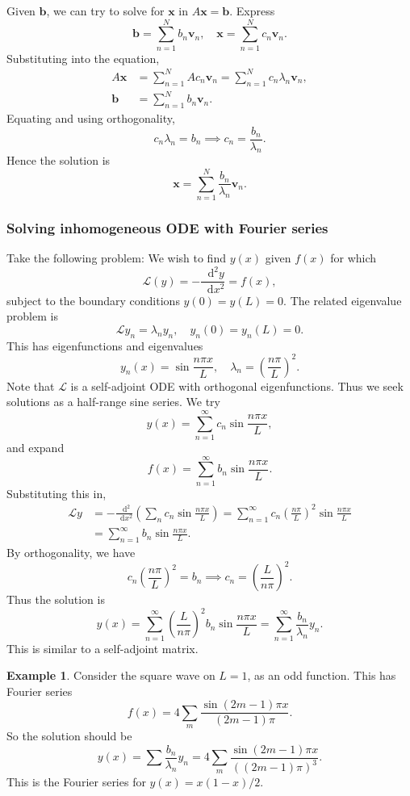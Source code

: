 \documentclass[12pt]{article}
\newcommand{\diff}{\mathop{}\!\mathrm{d}}
\newcommand{\Diff}[1]{\mathop{}\!\mathrm{d}^{#1}}
\theoremstyle{definition}
\newtheorem{example}{Example}[section]
\theoremstyle{remark}
\begin{document}
Given $\mathbf{b}$, we can try to solve for $\mathbf{x}$ in $A \mathbf{x} = \mathbf{b}$. Express 
\[
	\mathbf{b} = \sum_{n = 1}^{N} b_n \mathbf{v}_n, \quad \mathbf{x} = \sum_{n = 1}^{N} c_n \mathbf{v}_n
.\]
Substituting into the equation,
\begin{align*}
	A \mathbf{x} &= \sum_{n = 1}^{N} A c_n \mathbf{v}_n = \sum_{n = 1}^{N} c_n \lambda_n \mathbf{v}_n, \\
	\mathbf{b} &= \sum_{n = 1}^{N} b_n \mathbf{v}_n.
\end{align*}
Equating and using orthogonality,
\[
c_n \lambda_n = b_n \implies c_n = \frac{b_n}{\lambda_n}
.\]
Hence the solution is
\[
\mathbf{x} = \sum_{n = 1}^{N}\frac{b_n}{\lambda_n} \mathbf{v}_n
.\]

\subsubsection{Solving inhomogeneous ODE with Fourier series}%
\label{subsub:solving_inhomogeneous_ode_with_fourier_series}

Take the following problem: We wish to find $y(x)$ given $f(x)$ for which
\[
	\mathcal{L}(y) = - \frac{\Diff2 y}{\diff x^2} = f(x)
,\]
subject to the boundary conditions $y(0) = y(L) = 0$. The related eigenvalue problem is 
\[
	\mathcal{L}y_n = \lambda_n y_n, \quad y_n(0) = y_n(L) = 0
.\]
This has eigenfunctions and eigenvalues
\[
	y_n(x) = \sin \frac{n \pi x}{L}, \quad \lambda_n = \left( \frac{n \pi}{L} \right)^2
.\]
Note that $\mathcal{L}$ is a self-adjoint ODE with orthogonal eigenfunctions. Thus we seek solutions as a half-range sine series. We try
\[
	y(x) = \sum_{n = 1}^{\infty} c_n \sin \frac{n \pi x}{L},
\]
and expand
\[
	f(x) = \sum_{n = 1}^{\infty} b_n \sin \frac{n \pi x}{L}
.\]
Substituting this in,
\begin{align*}
	\mathcal{L}y &= - \frac{\Diff2}{\diff x^2} \left( \sum_{n} c_n \sin \frac{n \pi x}{L} \right) = \sum_{n = 1}^{\infty} c_n \left(\frac{n \pi}{L} \right)^2 \sin \frac{n \pi x}{L} \\
		     &= \sum_{n = 1}^{\infty} b_n \sin \frac{n \pi x}{L}.
\end{align*}
By orthogonality, we have
\[
	c_n \left( \frac{n \pi}{L}\right)^2 = b_n \implies c_n = \left( \frac{L}{n \pi} \right)^2
.\]
Thus the solution is
\[
	y(x) = \sum_{n = 1}^{\infty} \left( \frac{L}{n \pi}\right)^2 b_n \sin \frac{n \pi x}{L} = \sum_{n = 1}^{\infty} \frac{b_n}{\lambda_n} y_n
.\]
This is similar to a self-adjoint matrix.

\begin{adjustbox}{minipage = \columnwidth - 25.5pt, margin=1em, frame=1pt, margin=0em}
\begin{example}
	Consider the square wave on $L = 1$, as an odd function. This has Fourier series
	\[
		f(x) = 4 \sum_{m} \frac{\sin (2m - 1)\pi x}{(2m - 1)\pi}
	.\]
	So the solution should be
	\[
		y(x) = \sum \frac{b_n}{\lambda_n} y_n = 4 \sum_{m} \frac{\sin (2m - 1)\pi x}{((2m -1)\pi)^3}
	.\]
	This is the Fourier series for $y(x) = x(1-x)/2$.
\end{example}

\end{adjustbox}
\end{document}
